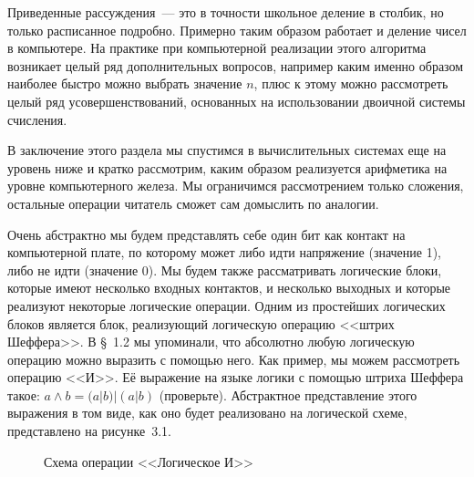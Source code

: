 Приведенные рассуждения~--- это в точности школьное деление в столбик, но только расписанное подробно. Примерно таким образом работает и деление чисел в компьютере. На практике при компьютерной реализации этого алгоритма возникает целый ряд дополнительных вопросов, например каким именно образом наиболее быстро можно выбрать значение $n$, плюс к этому можно рассмотреть целый ряд усовершенствований, основанных на использовании двоичной системы счисления.

В заключение этого раздела мы спустимся в вычислительных системах еще на уровень ниже и кратко рассмотрим, каким образом реализуется арифметика на уровне компьютерного железа. Мы ограничимся рассмотрением только сложения, остальные операции читатель сможет сам домыслить по аналогии.

Очень абстрактно мы будем представлять себе один бит как контакт на компьютерной плате, по которому может либо идти напряжение (значение 1), либо не идти (значение 0). Мы будем также рассматривать логические блоки, которые имеют несколько входных контактов, и несколько выходных и которые реализуют некоторые логические операции. Одним из простейших логических блоков является блок, реализующий логическую операцию <<штрих Шеффера>>. В \S~1.2 мы упоминали, что абсолютно любую логическую операцию можно выразить с помощью него. Как пример, мы можем рассмотреть операцию <<И>>. Её выражение на языке логики с помощью штриха Шеффера такое: $a\land b = (a|b)|(a|b)$ (проверьте). Абстрактное представление этого выражения в том виде, как оно будет реализовано на логической схеме, представлено на рисунке~3.1.
\begin{figure}[h]
\centering
{}
\caption{Схема операции <<Логическое И>>}
\end{figure}

